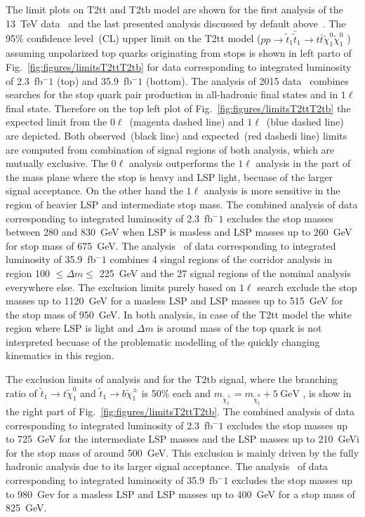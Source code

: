 The limit plots on T2tt and T2tb model are shown for the first analysis of the 13~TeV data~\cite{Sirunyan:2016jpr} and the last presented analysis discussed by default above~\cite{Sirunyan:2017xse}. The 95\% confidence level~(CL) upper limit on the T2tt model ($ pp \to \tilde{t}_{1} \bar{\tilde{t}}_{1} \to t \bar{t} \tilde{\chi}^{0}_{1} \tilde{\chi}^{0}_{1}$ ) assuming unpolarized top quarks originating from stops is shown in left parto of Fig.~\ref{fig:figures/limitsT2ttT2tb} for data corresponding to integrated luminosity of 2.3~fb$^-1$ (top) and 35.9~fb$^-1$ (bottom). The analysis of 2015 data~\cite{Sirunyan:2016jpr} combines searches for the stop quark pair production in all-hadronic final states and in $1\ell$ final state. Therefore on the top left plot of Fig.~\ref{fig:figures/limitsT2ttT2tb} the expected limit from the $0\ell$~(magenta dashed line) and $1\ell$~(blue dashed line) are depicted. Both observed~(black line) and expected~(red dashedi line) limits are computed from combination of signal regions of both analysis, which are mutually exclusive. The $0\ell$ analysis outperforms the $1\ell$ analysis in the part of the mass plane where the stop is heavy and LSP light, becuase of the larger signal acceptance. On the other hand the $1\ell$ analysis is more sensitive in the region of heavier LSP and intermediate stop mass. The combined analysis of data corresponding to integrated luminosity of 2.3~fb$^-1$ excludes the stop masses between 280 and 830~GeV when LSP is masless and LSP masses up to 260~GeV for stop mass of 675~GeV. The analysis~\cite{Sirunyan:2017xse} of data corresponding to integrated luminosity of 35.9~fb$^-1$ combines 4 singal regions of the corridor analysis in region 100 $\leq \Delta m \leq $ 225~GeV and the 27 signal regions of the nominal analysis everywhere else. The exclusion limits purely based on $1\ell$ search exclude  the stop masses up to 1120~GeV for a masless LSP and LSP masses up to 515~GeV for the stop mass of 950~GeV. In both analysis, in case of the T2tt model the white region where LSP is light and $\Delta m$ is around mass of the top quark is not interpreted becuase of the problematic modelling of the quickly changing kinematics in this region.

The exclusion limits of analysis \cite{Sirunyan:2016jpr} and  \cite{Sirunyan:2017xse} for the T2tb signal, where the branching ratio of $ \tilde{t}_{1} \to t  \tilde{\chi}^{0}_{1} $ and $ \tilde{t}_{1} \to b  \tilde{\chi}^{\pm}_{1} $  is 50\% each and $m_{\tilde{\chi}_{1}^{\pm}} = m_{\tilde{\chi}_{1}^{0}} + 5~\mathrm{GeV}$ , is show in the right part of Fig.~\ref{fig:figures/limitsT2ttT2tb}. The combined analysis of data corresponding to integrated luminosity of 2.3~fb$^-1$ excludes the stop masses up to 725~GeV for the intermediate LSP masses and the LSP masses up to 210~GeVi for the stop mass of around 500~GeV. This exclusion is mainly driven by the fully hadronic analysis due to its larger signal acceptance. The analysis~\cite{Sirunyan:2017xse} of data corresponding to integrated luminosity of 35.9~fb$^-1$ excludes the stop masses up to 980~Gev for a masless LSP and LSP masses up to 400~GeV for a stop mass of 825~GeV. 

